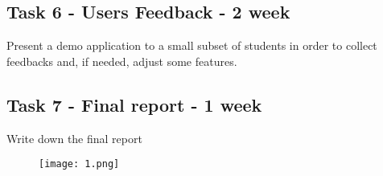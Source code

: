 \documentclass[11pt]{report}
\begin{document}
\subsection*{Task 6 - Users Feedback - 2 week}
Present a demo application to a small subset of students in order to collect feedbacks and, if needed, adjust some features.
\subsection*{Task 7 - Final report - 1 week}
Write down the final report
\begin{figure}[h]
\texttt{[image: 1.png]}
\end{figure}
\end{document}
